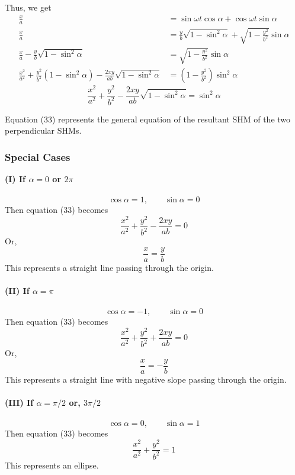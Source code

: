 \documentclass[12pt]{article}
\begin{document}
Thus, we get
\begin{align*}
    \frac{x}{a} &= \sin{\omega t}\cos{\alpha} + \cos{\omega t}\sin{\alpha} \\
    \frac{x}{a} &= \frac{y}{b} \sqrt{1 - \sin^2{\alpha}} + \sqrt{1 - \frac{y^2}{b^2}} \sin{\alpha} \\
    \frac{x}{a} - \frac{y}{b} \sqrt{1 - \sin^2{\alpha}} &= \sqrt{1 - \frac{y^2}{b^2}} \sin{\alpha} \\
    \frac{x^2}{a^2} + \frac{y^2}{b^2} (1 - \sin^2{\alpha}) - \frac{2xy}{ab} \sqrt{1 - \sin^2{\alpha}} &= \left( 1 - \frac{y^2}{b^2} \right) \sin^2{\alpha}
\end{align*}
\begin{equation}
    \boxed{ \frac{x^2}{a^2} + \frac{y^2}{b^2} - \frac{2xy}{ab} \sqrt{1 - \sin^2{\alpha}} = \sin^2{\alpha} }
\end{equation}

Equation (33) represents the general equation of the resultant SHM of the two perpendicular SHMs.

\subsubsection{Special Cases}
\textbf{(I) If $\alpha=0$ or $2\pi$}\\~\\
\[ \cos{\alpha} = 1, \qquad \sin{\alpha} = 0 \]
Then equation (33) becomes \[
    \frac{x^2}{a^2} + \frac{y^2}{b^2} - \frac{2xy}{ab} = 0
\]
Or, \[
    \frac{x}{a} = \frac{y}{b}
\]
This represents a straight line passing through the origin.\\~\\


\textbf{(II) If $\alpha=\pi$}\\~\\
\[ \cos{\alpha} = -1, \qquad \sin{\alpha} = 0 \]
Then equation (33) becomes \[
    \frac{x^2}{a^2} + \frac{y^2}{b^2} + \frac{2xy}{ab} = 0
\]
Or, \[
    \frac{x}{a} = -\frac{y}{b}
\]
This represents a straight line with negative slope passing through the origin.\\~\\


\textbf{(III) If $\alpha=\pi/2$ or, $3\pi/2$}\\~\\
\[ \cos{\alpha} = 0, \qquad \sin{\alpha} = 1 \]
Then equation (33) becomes \[
    \frac{x^2}{a^2} + \frac{y^2}{b^2} = 1
\]
This represents an ellipse.\\~\\
\end{document}
